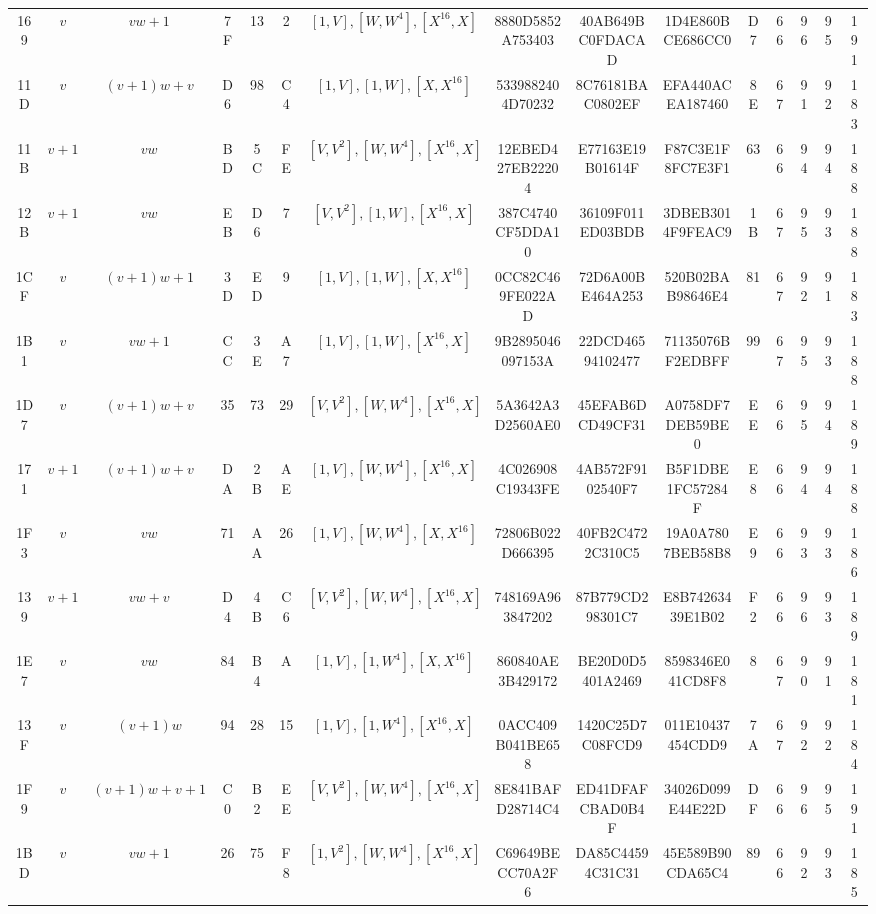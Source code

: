 \begin{table}
\begin{tabular}{|c|c|c|c|c|c|c|c|c|c|c|c|c|c|c|}
169 & $v$ & $vw + 1$ & 7F & 13 & 2 & $[1, V], [W, W^4], [X^{16}, X]$ & 8880D5852A753403 & 40AB649BC0FDACAD & 1D4E860BCE686CC0 & D7 & 66 &  96 & 95 & 191 \\
11D & $v$ & $(v + 1)w + v$ & D6 & 98 & C4 & $[1, V], [1, W], [X, X^{16}]$ & 5339882404D70232 & 8C76181BAC0802EF & EFA440ACEA187460 & 8E & 67 &  91 & 92 & 183 \\
11B & $v + 1$ & $vw$ & BD & 5C & FE & $[V, V^2], [W, W^4], [X^{16}, X]$ & 12EBED427EB22204 & E77163E19B01614F & F87C3E1F8FC7E3F1 & 63 & 66 &  94 & 94 & 188 \\
12B & $v + 1$ & $vw$ & EB & D6 & 7 & $[V, V^2], [1, W], [X^{16}, X]$ & 387C4740CF5DDA10 & 36109F011ED03BDB & 3DBEB3014F9FEAC9 & 1B & 67 &  95 & 93 & 188 \\
1CF & $v$ & $(v + 1)w + 1$ & 3D & ED & 9 & $[1, V], [1, W], [X, X^{16}]$ & 0CC82C469FE022AD & 72D6A00BE464A253 & 520B02BAB98646E4 & 81 & 67 &  92 & 91 & 183 \\
1B1 & $v$ & $vw + 1$ & CC & 3E & A7 & $[1, V], [1, W], [X^{16}, X]$ & 9B2895046097153A & 22DCD46594102477 & 71135076BF2EDBFF & 99 & 67 &  95 & 93 & 188 \\
1D7 & $v$ & $(v + 1)w + v$ & 35 & 73 & 29 & $[V, V^2], [W, W^4], [X^{16}, X]$ & 5A3642A3D2560AE0 & 45EFAB6DCD49CF31 & A0758DF7DEB59BE0 & EE & 66 &  95 & 94 & 189 \\
171 & $v + 1$ & $(v + 1)w + v$ & DA & 2B & AE & $[1, V], [W, W^4], [X^{16}, X]$ & 4C026908C19343FE & 4AB572F9102540F7 & B5F1DBE1FC57284F & E8 & 66 &  94 & 94 & 188 \\
1F3 & $v$ & $vw$ & 71 & AA & 26 & $[1, V], [W, W^4], [X, X^{16}]$ & 72806B022D666395 & 40FB2C4722C310C5 & 19A0A7807BEB58B8 & E9 & 66 &  93 & 93 & 186 \\
139 & $v + 1$ & $vw + v$ & D4 & 4B & C6 & $[V, V^2], [W, W^4], [X^{16}, X]$ & 748169A963847202 & 87B779CD298301C7 & E8B74263439E1B02 & F2 & 66 &  96 & 93 & 189 \\
1E7 & $v$ & $vw$ & 84 & B4 & A & $[1, V], [1, W^4], [X, X^{16}]$ & 860840AE3B429172 & BE20D0D5401A2469 & 8598346E041CD8F8 & 8 & 67 &  90 & 91 & 181 \\
13F & $v$ & $(v + 1)w$ & 94 & 28 & 15 & $[1, V], [1, W^4], [X^{16}, X]$ & 0ACC409B041BE658 & 1420C25D7C08FCD9 & 011E10437454CDD9 & 7A & 67 &  92 & 92 & 184 \\
1F9 & $v$ & $(v + 1)w + v + 1$ & C0 & B2 & EE & $[V, V^2], [W, W^4], [X^{16}, X]$ & 8E841BAFD28714C4 & ED41DFAFCBAD0B4F & 34026D099E44E22D & DF & 66 &  96 & 95 & 191 \\
1BD & $v$ & $vw + 1$ & 26 & 75 & F8 & $[1, V^2], [W, W^4], [X^{16}, X]$ & C69649BECC70A2F6 & DA85C44594C31C31 & 45E589B90CDA65C4 & 89 & 66 &  92 & 93 & 185 \\

\end{tabular}
\end{table}
